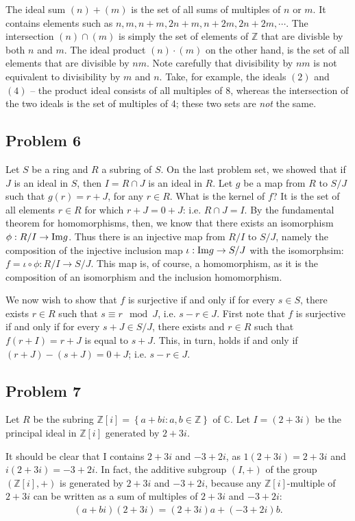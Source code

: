 \documentclass{../../mathnotes}
\begin{document}
The ideal sum $(n)+(m)$ is the set of all sums of multiples of $n$ or $m$. It contains elements such as $n, m, n+m, 2n+m,
n+2m, 2n+2m,\cdots$. The intersection $(n)\cap(m)$ is simply the set of elements of $\mathbb{Z}$ that are divisble by
both $n$ and $m$. The ideal product $(n)\cdot(m)$ on the other hand, is the set of all elements that are divisible by
$nm$. Note carefully that divisibility by $nm$ is not equivalent to divisibility by $m$ and $n$. Take, for example, the
ideals $(2)$ and $(4)$ -- the product ideal consists of all multiples of 8, whereas the intersection of the two ideals
is the set of multiples of 4; these two sets are \textit{not} the same.

\subsection*{Problem 6}

Let $S$ be a ring and $R$ a subring of $S$. On the last problem set, we showed that if $J$ is an ideal in $S$, then
$I=R\cap J$ is an ideal in $R$. Let $g$ be a map from $R$ to $S/J$ such that $g(r)=r+J$, for any $r\in R$. What is the
kernel of $f$? It is the set of all elements $r\in R$ for which $r+J=0+J$: i.e. $R\cap J=I$. By the fundamental theorem
for homomorphisms, then, we know that there exists an isomorphism $\phi:R/I\to{\rm Im} g$. Thus there is an injective map
from $R/I$ to $S/J$, namely the composition of the injective inclusion map $\iota:{\rm Im}g\to S/J$ with the isomorphsim:
$f=\iota\circ\phi:R/I\to S/J$. This map is, of course, a homomorphism, as it is the composition of an isomorphism and the
inclusion homomorphism.

We now wish to show that $f$ is surjective if and only if for every $s\in S$, there exists $r\in R$ such that
$s\equiv r\mod J$, i.e. $s-r\in J$. First note that $f$ is surjective if and only if for every $s+J\in S/J$, there exists
and $r\in R$ such that $f(r+I)=r+J$ is equal to $s+J$. This, in turn, holds if and only if $(r+J)-(s+J)=0+J$; i.e.
$s-r\in J$.

\subsection*{Problem 7}

Let $R$ be the subring $\mathbb{Z}[i]=\left\{ a+bi:a,b\in\mathbb{Z} \right\}$ of $\mathbb{C}$. Let $I=(2+3i)$ be the
principal ideal in $\mathbb{Z}[i]$ generated by $2+3i$.

It should be clear that I contains $2+3i$ and $-3+2i$, as $1(2+3i)=2+3i$ and $i(2+3i)=-3+2i$. In fact, the additive subgroup
$(I,+)$ of the group $(\mathbb{Z}[i],+)$ is generated by $2+3i$ and $-3+2i$, because any $\mathbb{Z}[i]$-multiple of $2+3i$
can be written as a sum of multiples of $2+3i$ and $-3+2i$:
\begin{align*}
    (a+bi)(2+3i)=(2+3i)a+(-3+2i)b.
\end{align*}
\end{document}
